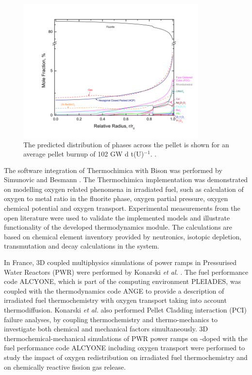	\begin{figure}[htbp]
		\begin{center}
		\includegraphics[width=0.85\textwidth]{figures/Piro_JNM}
		\caption{The predicted distribution of phases across the pellet is shown for an average pellet burnup of 102 GW d t(U)$^{-1}$. \cite{Piro13b}.}
		\label{fig:pirojnm}
		\end{center}
	\end{figure}

	The software integration of {Thermochimica} with {Bison} was performed by Simunovic and Besmann \cite{Besmann16}. The {Thermochimica} implementation was demonstrated on modelling oxygen related phenomena in irradiated fuel, such as calculation of oxygen to metal ratio in the fluorite phase, oxygen partial pressure, oxygen chemical potential and oxygen transport. Experimental measurements from the open literature were used to validate the implemented models and illustrate functionality of the developed thermodynamics module. The calculations are based on chemical element inventory provided by neutronics, isotopic depletion, transmutation and decay calculations in the \cite{SCALE05} system.

	In France, 3D coupled multiphysics simulations of power ramps in Pressurised Water Reactors (PWR) were performed by Konarski \textit{et al.} \cite{KONARSKI2019104}. The fuel performance code {ALCYONE}, which is part of the computing environment {PLEIADES}, was coupled with the thermodynamics code {ANGE} to provide a description of irradiated fuel thermochemistry with oxygen transport taking into account thermodiffusion. Konarski \textit{et al.} also performed Pellet Cladding interaction (PCI) failure analyses, by coupling thermochemistry and thermo-mechanics to investigate both chemical and mechanical factors simultaneously. 3D thermochemical-mechanical simulations of PWR power ramps on -doped  with the fuel performance code {ALCYONE} including oxygen transport were performed to study the impact of oxygen redistribution on irradiated fuel thermochemistry and on chemically reactive fission gas release.

